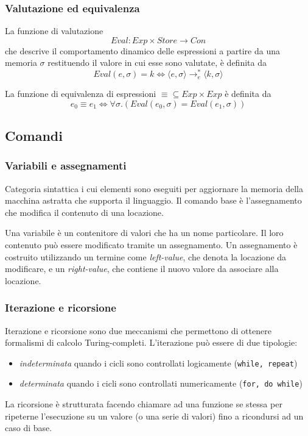 \documentclass[a4paper, 10pt]{article}
\begin{document}
	\subsubsection{Valutazione ed equivalenza}
	La funzione di valutazione 
	\[
	Eval:Exp \times Store \to Con
	\]
	che descrive il comportamento dinamico delle espressioni a partire da una memoria $\sigma$ restituendo il valore in cui esse sono valutate, è definita da 
	\[
	Eval(e, \sigma)=k \iff \langle e, \sigma \rangle \to_e^* \langle k, \sigma \rangle
	\]
	
	La funzione di equivalenza di espressioni $\equiv \subseteq Exp \times Exp$ è definita da 
	\[
	e_0 \equiv e_1 \iff \forall \sigma.(Eval(e_0,\sigma)=Eval(e_1, \sigma))
	\]
	
	\subsection{Comandi}
	\subsubsection{Variabili e assegnamenti}
	Categoria sintattica i cui elementi sono eseguiti per aggiornare la memoria della macchina astratta che supporta il linguaggio. Il comando base è l'assegnamento che modifica il contenuto di una locazione. 
	
	\noindent
	Una variabile è un contenitore di valori che ha un nome particolare. Il loro contenuto può essere modificato tramite un assegnamento. Un assegnamento è costruito utilizzando un termine come \textit{left-value}, che denota la locazione da modificare, e un \textit{right-value}, che contiene il nuovo valore da associare alla locazione.
	
	\subsubsection{Iterazione e ricorsione}
	Iterazione e ricorsione sono due meccanismi che permettono di ottenere formalismi di calcolo Turing-completi.
	L'iterazione può essere di due tipologie:
	\begin{itemize}
		\item \textit{indeterminata} quando i cicli sono controllati logicamente (\verb|while, repeat|)
		\item \textit{determinata} quando i cicli sono controllati numericamente (\verb|for, do while|)
	\end{itemize}
	
	La ricorsione è strutturata facendo chiamare ad una funzione se stessa per ripeterne l'esecuzione su un valore (o una serie di valori) fino a ricondursi ad un caso di base.
	
\end{document}
